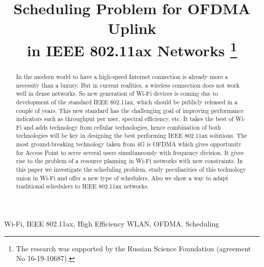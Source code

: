 
%


\IEEEoverridecommandlockouts

\title{%
Scheduling Problem for OFDMA Uplink \\in IEEE 802.11ax Networks
\thanks{The research was supported by the Russian Science Foundation (agreement No 16-19-10687).}}

\author{
}

\maketitle

\begin{abstract}
In the modern world to have a high-speed Internet connection is already more a necessity than a luxury. 
But in current realities, a wireless connection does not work well in dense networks. 
So new generation of Wi-Fi devices is coming due to development of the standard IEEE 802.11ax, which should be publicly released in a couple of years. 
This new standard has the challenging goal of improving performance indicators such as throughput per user, spectral efficiency, etc. 
It takes the best of Wi-Fi and adds technology from cellular technologies, hence combination of both technologies will be key in designing the best performing IEEE 802.11ax solutions. The most ground-breaking technology taken from 4G is OFDMA which gives opportunity for Access Point to serve several users simultaneously with frequency division. 
It gives rise to the problem of a resource planning in Wi-Fi networks with new constraints.
In this paper we investigate the scheduling problem, study peculiarities of this technology union in Wi-Fi and offer a new type of schedulers.
Also we show a way to adapt traditional schedulers to  IEEE 802.11ax networks.
\end{abstract}

\begin{IEEEkeywords}
Wi-Fi, IEEE 802.11ax, High Efficiency WLAN, OFDMA, Scheduling
\end{IEEEkeywords}

